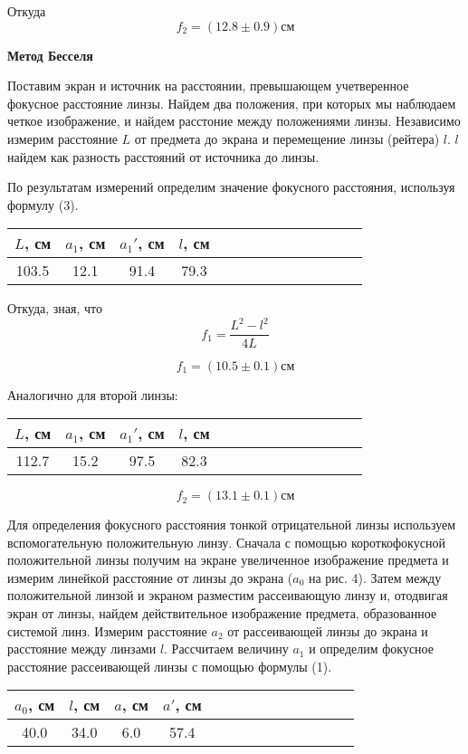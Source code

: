 \documentclass[14pt]{article}
\begin{document}
Откуда
$$
	f_2 = (12.8 \pm 0.9)\text{см}
$$

\textbf{Метод Бесселя}

Поставим экран и источник на расстоянии, превышающем учетверенное фокусное расстояние линзы. Найдем два положения, при которых мы наблюдаем четкое изображение, и найдем расстоние между положениями линзы. Независимо измерим расстояние $L$ от предмета до экрана
и перемещение линзы (рейтера) $l$. $l$ найдем как разность расстояний от источника до линзы.

По результатам измерений определим значение фокусного расстояния,
используя формулу (3).

\begin{center}
\begin{tabular}{|c|c|c|c|c|c|c|c|c|c|c|c|c|c|}
\hline
$L$, см		&	$a_1$, см	&	$a_1'$, см	&	$l$, см		\\
\hline
103.5		&	12.1		&	91.4		&	79.3		\\
\hline
\end{tabular}
\end{center}

Откуда, зная, что
$$
	f_1 = \frac{L^2 - l^2}{4L}
$$

$$
	f_1 = (10.5 \pm 0.1)\text{см}
$$

Аналогично для второй линзы:
\begin{center}
\begin{tabular}{|c|c|c|c|c|c|c|c|c|c|c|c|c|c|}
\hline
$L$, см		&	$a_1$, см	&	$a_1'$, см	&	$l$, см		\\
\hline
112.7		&	15.2		&	97.5		&	82.3		\\
\hline
\end{tabular}
\end{center}

$$
	f_2 = (13.1 \pm 0.1)\text{см}
$$

Для определения фокусного расстояния тонкой отрицательной линзы используем
вспомогательную положительную линзу. Сначала с помощью
короткофокусной положительной линзы получим на экране увеличенное
изображение предмета
и измерим линейкой расстояние от линзы до
экрана ($a_0$ на рис. 4). Затем между положительной линзой
и экраном
разместим рассеивающую линзу и, отодвигая экран от линзы, найдем
действительное изображение предмета, образованное системой линз. Измерим
расстояние
$a_2$ от рассеивающей линзы до экрана
и расстояние
между линзами $l$.
Рассчитаем величину $a_1$ и определим фокусное расстояние рассеивающей
линзы с помощью формулы (1).

\begin{center}
\begin{tabular}{|c|c|c|c|c|c|c|c|c|c|c|c|c|c|}
\hline
$a_0$, см	&	$l$, см		&	$a$, см		&	$a'$, см	\\
\hline
40.0		&	34.0		&	6.0			&	57.4		\\
\hline
\end{tabular}
\end{center}
\end{document}
